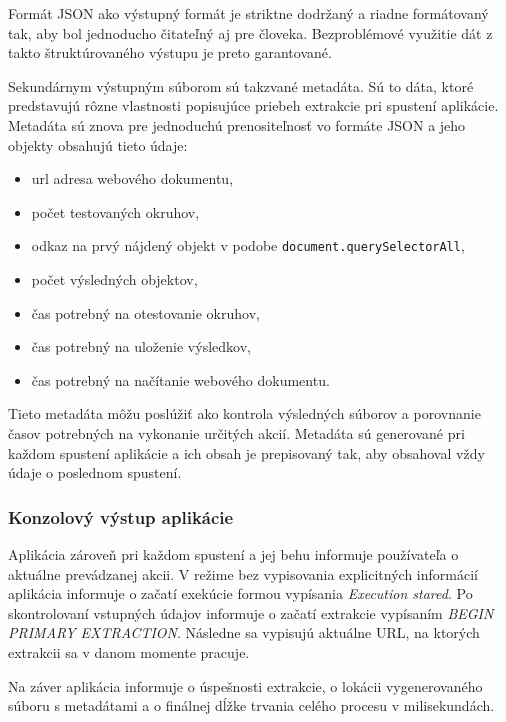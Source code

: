 Formát JSON ako výstupný formát je striktne dodržaný a riadne formátovaný tak, aby bol jednoducho čitateľný aj pre človeka. Bezproblémové využitie dát z takto štruktúrovaného výstupu je preto garantované.

\bigskip

Sekundárnym výstupným súborom sú takzvané metadáta. Sú to dáta, ktoré predstavujú rôzne vlastnosti popisujúce priebeh extrakcie pri spustení aplikácie. Metadáta sú znova pre jednoduchú prenositeľnosť vo formáte JSON a jeho objekty obsahujú tieto údaje:

\begin{itemize}
    \item url adresa webového dokumentu,
    \item počet testovaných okruhov,
    \item odkaz na prvý nájdený objekt v podobe \texttt{document.querySelectorAll},
    \item počet výsledných objektov,
    \item čas potrebný na otestovanie okruhov,
    \item čas potrebný na uloženie výsledkov,
    \item čas potrebný na načítanie webového dokumentu.
\end{itemize}

\bigskip

Tieto metadáta môžu poslúžiť ako kontrola výsledných súborov a porovnanie časov potrebných na vykonanie určitých akcií. Metadáta sú generované pri každom spustení aplikácie a ich obsah je prepisovaný tak, aby obsahoval vždy údaje o poslednom spustení.


\subsubsection{Konzolový výstup aplikácie}

Aplikácia zároveň pri každom spustení a jej behu informuje používateľa o aktuálne prevádzanej akcii. V režime bez vypisovania explicitných informácií aplikácia informuje o začatí exekúcie formou vypísania \textit{Execution stared}.  Po skontrolovaní vstupných údajov informuje o začatí extrakcie vypísaním \textit{BEGIN PRIMARY EXTRACTION}. Následne sa vypisujú aktuálne URL, na ktorých extrakcii sa v danom momente pracuje. 

Na záver aplikácia informuje o úspešnosti extrakcie, o lokácii vygenerovaného súboru s metadátami a o finálnej dĺžke trvania celého procesu v milisekundách.

